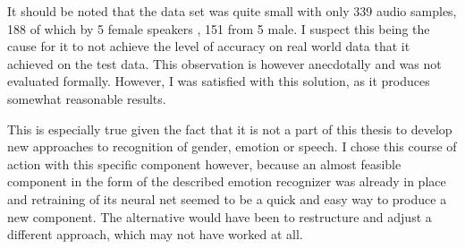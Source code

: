 It should be noted that the data set was quite small with only 339 audio samples, 188 of which by 5 female speakers , 151 from 5 male.
I suspect this being the cause for it to not achieve the level of accuracy on real world data that it achieved on the test data.
This observation is however anecdotally and was not evaluated formally.
However, I was satisfied with this solution, as it produces somewhat reasonable results.

This is especially true given the fact that it is not a part of this thesis to develop new approaches to recognition of gender, emotion or speech.
I chose this course of action with this specific component however, because an almost feasible component in the form of the described emotion recognizer was already in place and retraining of its neural net seemed to be a quick and easy way to produce a new component.
The alternative would have been to restructure and adjust a different approach, which may not have worked at all.







